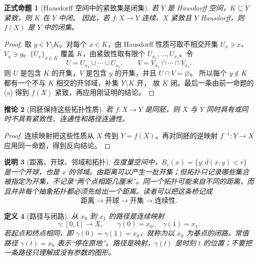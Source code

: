 \documentclass[UTF8,fontset=none,a4paper,11pt]{ctexart}
\theoremstyle{foundation-definition}
\newtheorem{definition}{定义}[section]
\theoremstyle{foundation-theorem}
\theoremstyle{foundation-proposition}
\newtheorem{proposition}[definition]{正式命题}
\theoremstyle{foundation-example}
\theoremstyle{foundation-remark}
\newtheorem{remark}[definition]{说明}
\theoremstyle{foundation-theorem}
\newtheorem{corollary}[definition]{推论}
\begin{document}
\begin{proposition}[Hausdorff 空间中的紧致集是闭集]\label{prop:compact-closed-hausdorff}
若 \(Y\) 是 Hausdorff 空间，\(K\subseteq Y\) 紧致，则 \(K\) 在 \(Y\) 中闭。
因此，若 \(f:X\to Y\) 连续、\(X\) 紧致且 \(Y\) Hausdorff，则 \(f(X)\) 是 \(Y\) 中的闭集。
\end{proposition}

\begin{proof}
取 \(y\in Y\setminus K\)。对每个 \(x\in K\)，由 Hausdorff 性质可取不相交开集
\(U_x\ni x\)、\(V_x\ni y\)。\(\{U_x\}_{x\in K}\) 覆盖 \(K\)，由紧致性取有限个
\(U_{x_1},\ldots,U_{x_r}\)。令
\[
U=U_{x_1}\cup\cdots\cup U_{x_r},\qquad
V=V_{x_1}\cap\cdots\cap V_{x_r}.
\]
则 \(U\) 是包含 \(K\) 的开集，\(V\) 是包含 \(y\) 的开集，并且 \(U\cap V=\varnothing\)。
所以每个 \(y\notin K\) 都有一个不与 \(K\) 相交的开邻域，补集 \(Y\setminus K\) 开，
故 \(K\) 闭。最后一条由前一命题的 (a) 得到 \(f(X)\) 紧致，再应用刚证明的结论。\end{proof}

\begin{corollary}[同胚保持这些拓扑性质]\label{cor:homeomorphism-invariants-basic}
若 \(f:X\to Y\) 是同胚，则 \(X\) 与 \(Y\) 同时具有或同时不具有紧致性、连通性和路径连通性。
\end{corollary}

\begin{proof}
连续映射把这些性质从 \(X\) 传到 \(Y=f(X)\)。再对同胚的逆映射
\(f^{-1}:Y\to X\) 应用同一命题，得到反向结论。\end{proof}

\begin{remark}[距离、开球、邻域和拓扑]
在度量空间中，\(B_r(x)=\{y:d(x,y)<r\}\) 是一个开球，也是 \(x\) 的邻域。由距离可以产生一批开集；但拓扑只记录哪些集合被指定为开集，不记录“两个点相距几厘米”。同一个拓扑可能来自不同的距离，而且并非每个抽象拓扑都必须先给出一个距离。读者可以把这条桥记成
\[
\text{距离}\longrightarrow\text{开球}\longrightarrow\text{开集}\longrightarrow\text{连续性}.
\]
\end{remark}

\begin{definition}[路径与闭路]\label{def:path-loop}
从 \(x_0\) 到 \(x_1\) 的路径是连续映射
\[
\gamma:[0,1]\to X,\qquad \gamma(0)=x_0,\quad\gamma(1)=x_1.
\]
若起点和终点相同，即 \(\gamma(0)=\gamma(1)=x_0\)，就称为以 \(x_0\) 为基点的闭路。常值路径 \(\gamma(t)=x_0\) 表示“停在原地”。路径是映射，\(\gamma(t)\) 是时刻 \(t\) 的位置；不要把一条路径只理解成没有参数的图形。
\end{definition}
\end{document}

